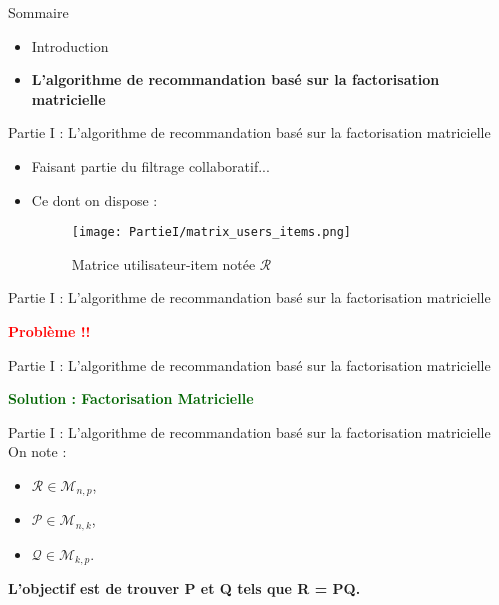 \newcommand{\PartieI}{Partie I : L'algorithme de recommandation basé sur la factorisation matricielle}

\begin{frame}{Sommaire}
    \begin{itemize}
        \item Introduction
        \item \textbf{L'algorithme de recommandation basé sur la factorisation matricielle}
    \end{itemize}
\end{frame}

\begin{frame}{\PartieI}
    \begin{itemize}
        \item Faisant partie du filtrage collaboratif...
        \item {
              Ce dont on dispose :
              \begin{figure}[htbp]
                  \centering
                  \hspace{80pt}
                  \texttt{[image: PartieI/matrix\_users\_items.png]}
                  \caption{Matrice utilisateur-item notée $\mathcal{R}$}
                  \label{fig:matrix-user-item}
              \end{figure}
              }
    \end{itemize}
\end{frame}

\begin{frame}{\PartieI}
    \begin{center}
        \textcolor{red}{\textbf{\large{Problème !!}}}
    \end{center}
\end{frame}

\begin{frame}{\PartieI}
    \begin{center}
        \textcolor{darkgreen}{\textbf{\large{Solution : Factorisation Matricielle}}}
    \end{center}
\end{frame}

\begin{frame}{\PartieI}
    On note :
    \begin{itemize}
        \item $\mathcal{R} \in \mathcal{M}_{n,p}$,
        \item $\mathcal{P} \in \mathcal{M}_{n,k}$,
        \item $\mathcal{Q} \in \mathcal{M}_{k,p}$.
    \end{itemize}
    \begin{center}
        \textbf{L'objectif est de trouver P et Q tels que R = PQ.}
    \end{center}
\end{frame}

